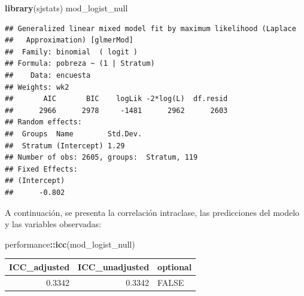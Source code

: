 \documentclass[
  spanish,
  12pt,
]{book}
\newenvironment{Shaded}{\begin{snugshade}}{\end{snugshade}}
\newcommand{\AttributeTok}[1]{\textcolor[rgb]{0.13,0.29,0.53}{#1}}
\newcommand{\CommentTok}[1]{\textcolor[rgb]{0.56,0.35,0.01}{\textit{#1}}}
\newcommand{\DataTypeTok}[1]{\textcolor[rgb]{0.13,0.29,0.53}{#1}}
\newcommand{\DecValTok}[1]{\textcolor[rgb]{0.00,0.00,0.81}{#1}}
\newcommand{\FunctionTok}[1]{\textcolor[rgb]{0.13,0.29,0.53}{\textbf{#1}}}
\newcommand{\NormalTok}[1]{#1}
\newcommand{\OtherTok}[1]{\textcolor[rgb]{0.56,0.35,0.01}{#1}}
\newcommand{\SpecialCharTok}[1]{\textcolor[rgb]{0.81,0.36,0.00}{\textbf{#1}}}
\newcommand{\StringTok}[1]{\textcolor[rgb]{0.31,0.60,0.02}{#1}}
\begin{document}
\begin{Shaded}
\begin{Highlighting}[]
\FunctionTok{library}\NormalTok{(sjstats)}
\NormalTok{mod\_logist\_null}
\end{Highlighting}
\end{Shaded}

\begin{verbatim}
## Generalized linear mixed model fit by maximum likelihood (Laplace
##   Approximation) [glmerMod]
##  Family: binomial  ( logit )
## Formula: pobreza ~ (1 | Stratum)
##    Data: encuesta
## Weights: wk2
##       AIC       BIC    logLik -2*log(L)  df.resid 
##      2966      2978     -1481      2962      2603 
## Random effects:
##  Groups  Name        Std.Dev.
##  Stratum (Intercept) 1.29    
## Number of obs: 2605, groups:  Stratum, 119
## Fixed Effects:
## (Intercept)  
##      -0.802
\end{verbatim}

A continuación, se presenta la correlación intraclase, las predicciones del modelo y las variables observadas:

\begin{Shaded}
\begin{Highlighting}[]
\NormalTok{performance}\SpecialCharTok{::}\FunctionTok{icc}\NormalTok{(mod\_logist\_null)}
\end{Highlighting}
\end{Shaded}

\begin{tabular}{r|r|l}
\hline
ICC\_adjusted & ICC\_unadjusted & optional\\
\hline
0.3342 & 0.3342 & FALSE\\
\hline
\end{tabular}

\begin{Shaded}
\end{Shaded}
\end{document}
